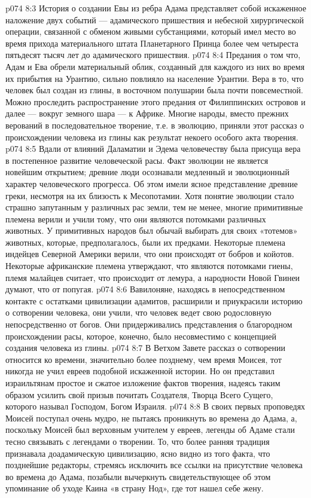 \vs p074 8:3 История о создании Евы из ребра Адама представляет собой искаженное наложение двух событий --- адамического пришествия и небесной хирургической операции, связанной с обменом живыми субстанциями, который имел место во время прихода материального штата Планетарного Принца более чем четыреста пятьдесят тысяч лет до адамического пришествия.
\vs p074 8:4 \pc Предания о том что, Адам и Ева обрели материальный облик, созданный для каждого из них во время их прибытия на Урантию, сильно повлияло на население Урантии. Вера в то, что человек был создан из глины, в восточном полушарии была почти повсеместной. Можно проследить распространение этого предания от Филиппинских островов и далее --- вокруг земного шара --- к Африке. Многие народы, вместо прежних верований в последовательное творение, т.е. в эволюцию, приняли этот рассказ о происхождении человека из глины как результат некоего особого акта творения.
\vs p074 8:5 Вдали от влияний Даламатии и Эдема человечеству была присуща вера в постепенное развитие человеческой расы. Факт эволюции не является новейшим открытием; древние люди осознавали медленный и эволюционный характер человеческого прогресса. Об этом имели ясное представление древние греки, несмотря на их близость к Месопотамии. Хотя понятие эволюции стало страшно запутанным у различных рас земли, тем не менее, многие примитивные племена верили и учили тому, что они являются потомками различных животных. У примитивных народов был обычай выбирать для своих «тотемов» животных, которые, предполагалось, были их предками. Некоторые племена индейцев Северной Америки верили, что они происходят от бобров и койотов. Некоторые африканские племена утверждают, что являются потомками гиены, племя малайцев считает, что происходит от лемура, а народности Новой Гвинеи думают, что от попугая.
\vs p074 8:6 Вавилоняне, находясь в непосредственном контакте с остатками цивилизации адамитов, расширили и приукрасили историю о сотворении человека, они учили, что человек ведет свою родословную непосредственно от богов. Они придерживались представления о благородном происхождении расы, которое, конечно, было несовместимо с концепцией создания человека из глины.
\vs p074 8:7 \pc В Ветхом Завете рассказ о сотворении относится ко времени, значительно более позднему, чем время Моисея, тот никогда не учил евреев подобной искаженной истории. Но он представил израильтянам простое и сжатое изложение фактов творения, надеясь таким образом усилить свой призыв почитать Создателя, Творца Всего Сущего, которого называл Господом, Богом Израиля.
\vs p074 8:8 В своих первых проповедях Моисей поступал очень мудро, не пытаясь проникнуть во времена до Адама, а, поскольку Моисей был верховным учителем у евреев, легенды об Адаме стали тесно связывать с легендами о творении. То, что более ранняя традиция признавала доадамическую цивилизацию, ясно видно из того факта, что позднейшие редакторы, стремясь исключить все ссылки на присутствие человека во времена до Адама, позабыли вычеркнуть свидетельствующее об этом упоминание об уходе Каина «в страну Нод», где тот нашел себе жену.
